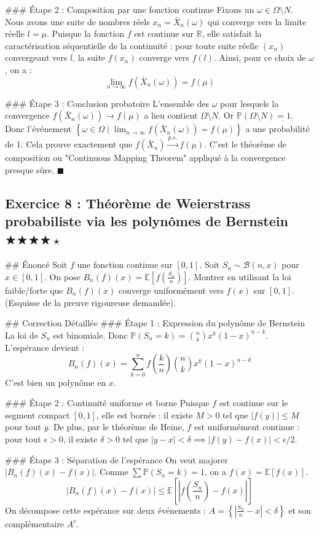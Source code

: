 \documentclass[11pt,a4paper]{article}
\begin{document}
\#\#\# Étape 2 : Composition par une fonction continue
Fixons un $\omega \in \Omega \setminus N$. Nous avons une suite de nombres réels $x_n = \bar{X}_n(\omega)$ qui converge vers la limite réelle $l = \mu$.
Puisque la fonction $f$ est continue sur $\mathbb{R}$, elle satisfait la caractérisation séquentielle de la continuité : pour toute suite réelle $(x_n)$ convergeant vers $l$, la suite $f(x_n)$ converge vers $f(l)$.
Ainsi, pour ce choix de $\omega$, on a :
$$ \lim_{n \to \infty} f(\bar{X}_n(\omega)) = f(\mu) $$

\#\#\# Étape 3 : Conclusion probatoire
L'ensemble des $\omega$ pour lesquels la convergence $f(\bar{X}_n(\omega)) \to f(\mu)$ a lieu contient $\Omega \setminus N$. Or $\mathbb{P}(\Omega \setminus N) = 1$.
Donc l'événement $\left\{ \omega \in \Omega \mid \lim_{n \to \infty} f(\bar{X}_n(\omega)) = f(\mu) \right\}$ a une probabilité de 1.
Cela prouve exactement que $f(\bar{X}_n) \xrightarrow{p.s.} f(\mu)$. C'est le théorème de composition ou "Continuous Mapping Theorem" appliqué à la convergence presque sûre. $\blacksquare$


\subsection*{Exercice 8 : Théorème de Weierstrass probabiliste via les polynômes de Bernstein \quad $\bigstar\bigstar\bigstar\bigstar\star$}

\#\# Énoncé
Soit $f$ une fonction continue sur $[0,1]$. Soit $S_n \sim \mathcal{B}(n, x)$ pour $x \in [0,1]$.
On pose $B_n(f)(x) = \mathbb{E}\left[f\left(\frac{S_n}{n}\right)\right]$.
Montrer en utilisant la loi faible/forte que $B_n(f)(x)$ converge uniformément vers $f(x)$ sur $[0,1]$. (Esquisse de la preuve rigoureuse demandée).

\#\# Correction Détaillée
\#\#\# Étape 1 : Expression du polynôme de Bernstein
La loi de $S_n$ est binomiale. Donc $\mathbb{P}(S_n = k) = \binom{n}{k} x^k (1-x)^{n-k}$. L'espérance devient :
$$ B_n(f)(x) = \sum_{k=0}^n f\left(\frac{k}{n}\right) \binom{n}{k} x^k (1-x)^{n-k} $$
C'est bien un polynôme en $x$.

\#\#\# Étape 2 : Continuité uniforme et borne
Puisque $f$ est continue sur le segment compact $[0,1]$, elle est bornée : il existe $M > 0$ tel que $|f(y)| \le M$ pour tout $y$.
De plus, par le théorème de Heine, $f$ est uniformément continue : pour tout $\epsilon > 0$, il existe $\delta > 0$ tel que $|y - x| < \delta \implies |f(y) - f(x)| < \epsilon/2$.

\#\#\# Étape 3 : Séparation de l'espérance
On veut majorer $|B_n(f)(x) - f(x)|$. Comme $\sum \mathbb{P}(S_n=k) = 1$, on a $f(x) = \mathbb{E}[f(x)]$.
$$ |B_n(f)(x) - f(x)| \le \mathbb{E}\left[ \left| f\left(\frac{S_n}{n}\right) - f(x) \right| \right] $$
On décompose cette espérance sur deux événements : $A = \left\{ \left| \frac{S_n}{n} - x \right| < \delta \right\}$ et son complémentaire $A^c$.
\end{document}
